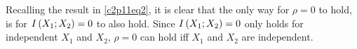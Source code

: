 \documentclass[ClusteringConnectionsMAIN.tex]{subfiles}
\begin{document}
	

  Recalling the result in \ref{c2p11eq2}, it is clear that the only way for $\rho = 0$ to hold, is for $I \left( X_1; X_2 \right) = 0$ to also hold.  Since $I \left( X_1; X_2 \right) = 0$ only holds for independent $X_1$ and $X_2$, $\rho = 0$ can hold iff $X_1$ and $X_2$ are independent.
\end{document}
